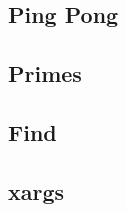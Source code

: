 
\subsection{Ping Pong}

\newpage

\subsection{Primes}

\newpage

\subsection{Find}

\newpage

\subsection{xargs}

\newpage